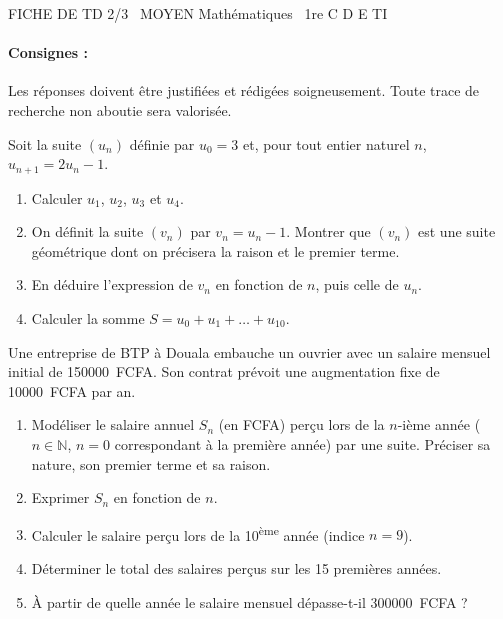 \documentclass[11pt]{article}
\begin{document}
\begin{tcolorbox}[enhanced,colback=popink,colframe=popink,arc=10pt,boxrule=0pt,left=12pt,right=12pt,top=9pt,bottom=9pt]
{\color{white}\popxbold\small FICHE DE TD 2/3 \textbullet\ MOYEN \hfill Mathématiques \textbullet\ 1re C D E TI\par}
\end{tcolorbox}
\vspace{4pt}
\paragraph{Consignes :} Les réponses doivent être justifiées et rédigées soigneusement. Toute trace de recherche non aboutie sera valorisée.

\begin{exercice}
Soit la suite $(u_n)$ définie par $u_0 = 3$ et, pour tout entier naturel $n$, $u_{n+1} = 2u_n - 1$.
\begin{enumerate}
    \item Calculer $u_1$, $u_2$, $u_3$ et $u_4$.
    \item On définit la suite $(v_n)$ par $v_n = u_n - 1$. Montrer que $(v_n)$ est une suite géométrique dont on précisera la raison et le premier terme.
    \item En déduire l'expression de $v_n$ en fonction de $n$, puis celle de $u_n$.
    \item Calculer la somme $S = u_0 + u_1 + \dots + u_{10}$.
\end{enumerate}
\end{exercice}

\begin{exercice}
Une entreprise de BTP à Douala embauche un ouvrier avec un salaire mensuel initial de \SI{150000}{FCFA}. Son contrat prévoit une augmentation fixe de \SI{10000}{FCFA} par an.
\begin{enumerate}
    \item Modéliser le salaire annuel $S_n$ (en FCFA) perçu lors de la $n$-ième année ($n \in \mathbb{N}$, $n=0$ correspondant à la première année) par une suite. Préciser sa nature, son premier terme et sa raison.
    \item Exprimer $S_n$ en fonction de $n$.
    \item Calculer le salaire perçu lors de la 10\textsuperscript{ème} année (indice $n=9$).
    \item Déterminer le total des salaires perçus sur les 15 premières années.
    \item À partir de quelle année le salaire mensuel dépasse-t-il \SI{300000}{FCFA} ?
\end{enumerate}
\end{exercice}
\end{document}
